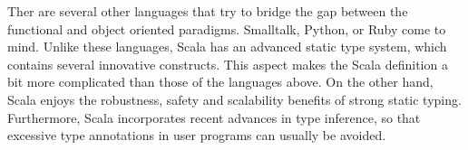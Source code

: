 Ther are several other languages that try to bridge the gap between
the functional and object oriented
paradigms. Smalltalk\cite{goldberg-robson:smalltalk-language},
Python\cite{rossum:python}, or Ruby\cite{matsumtoto:ruby} come to
mind. Unlike these languages, Scala has an advanced static type
system, which contains several innovative constructs.  This aspect
makes the Scala definition a bit more complicated than those of the
languages above. On the other hand, Scala enjoys the robustness,
safety and scalability benefits of strong static typing. Furthermore,
Scala incorporates recent advances in type inference, so that
excessive type annotations in user programs can usually be avoided.






